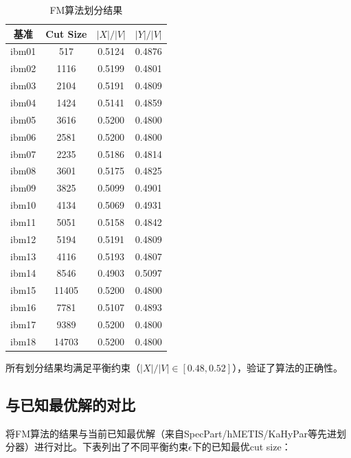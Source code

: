 \documentclass{SYSUReport}
\begin{document}
\begin{table}[H]
\centering
\caption{FM算法划分结果}
\begin{tabular}{|c|c|c|c|}
\hline
基准 & Cut Size & $|X|/|V|$ & $|Y|/|V|$ \\
\hline
ibm01 & 517 & 0.5124 & 0.4876 \\
\hline
ibm02 & 1116 & 0.5199 & 0.4801 \\
\hline
ibm03 & 2104 & 0.5191 & 0.4809 \\
\hline
ibm04 & 1424 & 0.5141 & 0.4859 \\
\hline
ibm05 & 3616 & 0.5200 & 0.4800 \\
\hline
ibm06 & 2581 & 0.5200 & 0.4800 \\
\hline
ibm07 & 2235 & 0.5186 & 0.4814 \\
\hline
ibm08 & 3601 & 0.5175 & 0.4825 \\
\hline
ibm09 & 3825 & 0.5099 & 0.4901 \\
\hline
ibm10 & 4134 & 0.5069 & 0.4931 \\
\hline
ibm11 & 5051 & 0.5158 & 0.4842 \\
\hline
ibm12 & 5194 & 0.5191 & 0.4809 \\
\hline
ibm13 & 4116 & 0.5193 & 0.4807 \\
\hline
ibm14 & 8546 & 0.4903 & 0.5097 \\
\hline
ibm15 & 11405 & 0.5200 & 0.4800 \\
\hline
ibm16 & 7781 & 0.5107 & 0.4893 \\
\hline
ibm17 & 9389 & 0.5200 & 0.4800 \\
\hline
ibm18 & 14703 & 0.5200 & 0.4800 \\
\hline
\end{tabular}
\end{table}

所有划分结果均满足平衡约束（$|X|/|V| \in [0.48, 0.52]$），验证了算法的正确性。

\subsection{与已知最优解的对比}
将FM算法的结果与当前已知最优解（来自SpecPart/hMETIS/KaHyPar等先进划分器）进行对比。下表列出了不同平衡约束$\epsilon$下的已知最优cut size：
\end{document}

